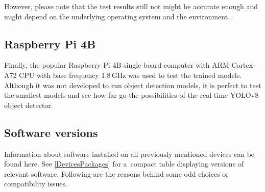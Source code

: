However, please note that the test results still not might be accurate enough
and might depend on the underlying operating system and the environment.


\subsection{Raspberry Pi 4B}

Finally, the popular Raspberry Pi 4B single-board computer with ARM Cortex-A72
CPU with base frequency 1.8\,GHz was used to test the trained models. Although it
was not developed to run object detection models, it is perfect to test the
smallest models and see how far go the possibilities of the real-time YOLOv8
object detector.


\subsection{Software versions}

Information about software installed on all previously mentioned devices can be
found here. See \autoref{DevicesPackages} for a~compact table displaying
versions of relevant software. Following are the reasons behind some odd choices
or compatibility issues.


